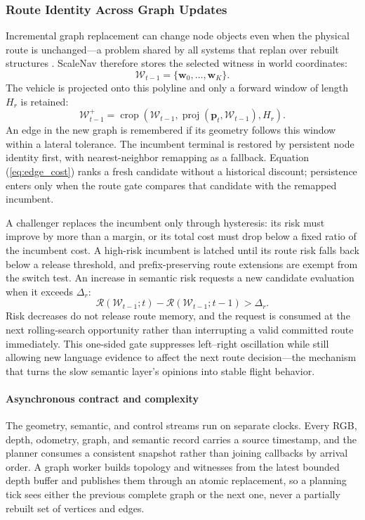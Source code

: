 \documentclass[letterpaper,10pt,conference]{ieeeconf}
\newcommand{\vect}[1]{\boldsymbol{#1}}
\begin{document}
\subsubsection{Route Identity Across Graph Updates}
Incremental graph replacement can change node objects even when the physical
route is unchanged---a problem shared by all systems that replan over
rebuilt structures \cite{octomap,voxblox}.  ScaleNav therefore stores the
selected witness in world coordinates:
\begin{equation}
 \mathcal{W}_{t-1}=\{\vect{w}_0,\ldots,\vect{w}_K\}.
\end{equation}
The vehicle is projected onto this polyline and only a forward window of
length $H_r$ is retained:
\begin{equation}
 \mathcal{W}^{+}_{t-1}=
 \operatorname{crop}(\mathcal{W}_{t-1},
                     \operatorname{proj}(\vect{p}_t,\mathcal{W}_{t-1}),H_r).
\end{equation}
An edge in the new graph is remembered if its geometry follows this window
within a lateral tolerance.  The incumbent terminal is restored by persistent
node identity first, with nearest-neighbor remapping as a fallback.
Equation (\ref{eq:edge_cost}) ranks a fresh candidate without a historical
discount; persistence enters only when the route gate compares that candidate
with the remapped incumbent.

A challenger replaces the incumbent only through hysteresis: its risk must
improve by more than a margin, or its total cost must drop below a fixed
ratio of the incumbent cost.  A high-risk incumbent is latched until its
route risk falls back below a release threshold, and prefix-preserving route
extensions are exempt from the switch test.  An increase in semantic risk
requests a new candidate evaluation when it exceeds $\Delta_r$:
\begin{equation}
 \mathcal{R}(\mathcal{W}_{t-1};t)-
 \mathcal{R}(\mathcal{W}_{t-1};t-1)>\Delta_r.
\end{equation}
Risk decreases do not release route memory, and the request is consumed at
the next rolling-search opportunity rather than interrupting a valid
committed route immediately.  This one-sided gate suppresses left--right
oscillation while still allowing new language evidence to affect the next
route decision---the mechanism that turns the slow semantic layer's opinions
into stable flight behavior.

\paragraph{Asynchronous contract and complexity}
The geometry, semantic, and control streams run on separate clocks.  Every
RGB, depth, odometry, graph, and semantic record carries a source timestamp,
and the planner consumes a consistent snapshot rather than joining callbacks
by arrival order.  A graph worker builds topology and witnesses from the
latest bounded depth buffer and publishes them through an atomic replacement,
so a planning tick sees either the previous complete graph or the next one,
never a partially rebuilt set of vertices and edges.
\end{document}

